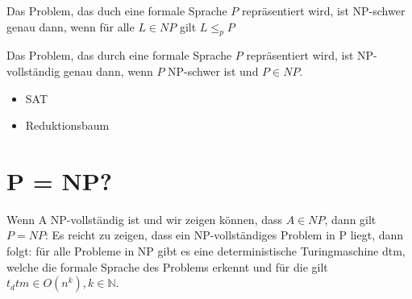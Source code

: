 Das Problem, das duch eine formale Sprache $P$ repräsentiert wird, ist NP-schwer
genau dann, wenn für alle $L \in NP$ gilt $L \leq_p P$

Das Problem, das durch eine formale Sprache $P$ repräsentiert wird, ist NP-vollständig
genau dann, wenn $P$ NP-schwer ist und $P \in NP$.

\begin{itemize}
    \item SAT
    \item Reduktionsbaum
\end{itemize}

\section{P = NP?}

Wenn A NP-vollständig ist und wir zeigen können, dass $A \in NP$, dann gilt $P = NP$:
Es reicht zu zeigen, dass ein NP-vollständiges Problem in P liegt,
dann folgt: für alle Probleme in NP gibt es eine deterministische Turingmaschine dtm,
welche die formale Sprache des Problems erkennt und für die gilt $t_dtm \in O(n^k), k \in \mathbb{N}$.

